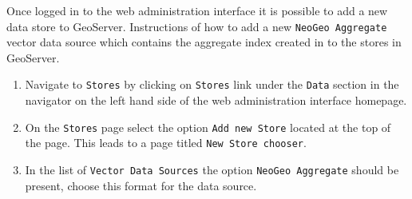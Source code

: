
Once logged in to the web administration interface it is possible to add a new data store to GeoServer. Instructions of how to add a new \lstinline|NeoGeo Aggregate| vector data source which contains the aggregate index created in  to the stores in GeoServer.

\begin{enumerate}
	\item Navigate to \lstinline|Stores| by clicking on \lstinline|Stores| link under the \lstinline|Data| section in the navigator on the left hand side of the web administration interface homepage.
	\item On the \lstinline|Stores| page select the option \lstinline|Add new Store| located at the top of the page. This leads to a page titled \lstinline|New Store chooser|.
	\item In the list of \lstinline|Vector Data Sources| the option \lstinline|NeoGeo Aggregate| should be present, choose this format for the data source.  
\end{enumerate}

